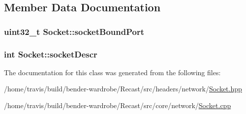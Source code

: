 \subsection{Member Data Documentation}
\hypertarget{class_socket_ab05ebf38966e1cd1f093819a6bdad5b1}{
\subsubsection[{socket\-Bound\-Port}]{\setlength{\rightskip}{0pt plus 5cm}uint32\-\_\-t Socket\-::socket\-Bound\-Port\hspace{0.3cm}{\ttfamily [protected]}}}\label{class_socket_ab05ebf38966e1cd1f093819a6bdad5b1}
\hypertarget{class_socket_a610fbf456550dd084cfaee9d1267e5c8}{
\subsubsection[{socket\-Descr}]{\setlength{\rightskip}{0pt plus 5cm}int Socket\-::socket\-Descr\hspace{0.3cm}{\ttfamily [protected]}}}\label{class_socket_a610fbf456550dd084cfaee9d1267e5c8}


The documentation for this class was generated from the following files\-:\begin{DoxyCompactItemize}
\item 
/home/travis/build/bender-\/wardrobe/\-Recast/src/headers/network/\hyperlink{_socket_8hpp}{Socket.\-hpp}\item 
/home/travis/build/bender-\/wardrobe/\-Recast/src/core/network/\hyperlink{_socket_8cpp}{Socket.\-cpp}\end{DoxyCompactItemize}
